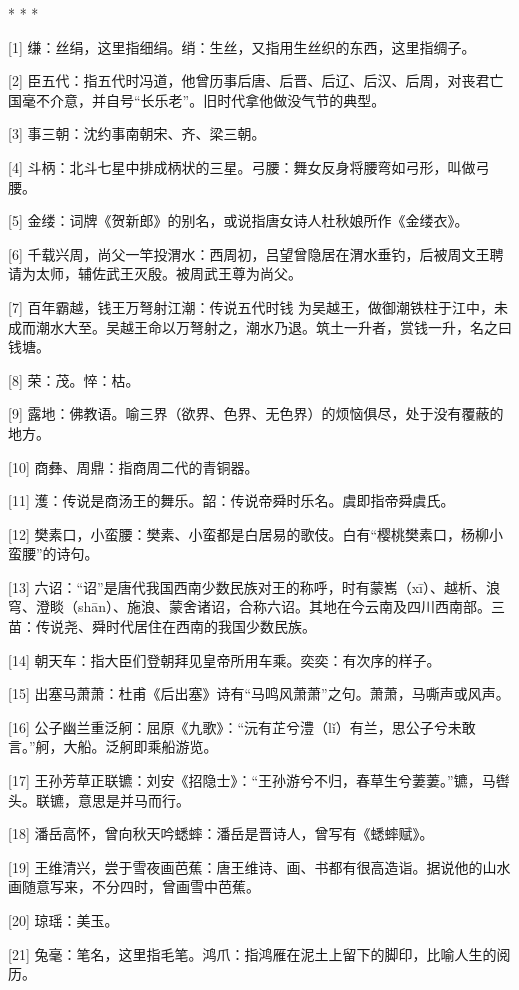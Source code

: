 \documentclass[12pt,UTF8]{ctexbook}
\begin{document}
* * *



[1] 缣：丝绢，这里指细绢。绡：生丝，又指用生丝织的东西，这里指绸子。

[2] 臣五代：指五代时冯道，他曾历事后唐、后晋、后辽、后汉、后周，对丧君亡国毫不介意，并自号“长乐老”。旧时代拿他做没气节的典型。

[3] 事三朝：沈约事南朝宋、齐、梁三朝。

[4] 斗柄：北斗七星中排成柄状的三星。弓腰：舞女反身将腰弯如弓形，叫做弓腰。

[5] 金缕：词牌《贺新郎》的别名，或说指唐女诗人杜秋娘所作《金缕衣》。

[6] 千载兴周，尚父一竿投渭水：西周初，吕望曾隐居在渭水垂钓，后被周文王聘请为太师，辅佐武王灭殷。被周武王尊为尚父。

[7] 百年霸越，钱王万弩射江潮：传说五代时钱 为吴越王，做御潮铁柱于江中，未成而潮水大至。吴越王命以万弩射之，潮水乃退。筑土一升者，赏钱一升，名之曰钱塘。

[8] 荣：茂。悴：枯。

[9] 露地：佛教语。喻三界（欲界、色界、无色界）的烦恼俱尽，处于没有覆蔽的地方。

[10] 商彝、周鼎：指商周二代的青铜器。

[11] 濩：传说是商汤王的舞乐。韶：传说帝舜时乐名。虞即指帝舜虞氏。

[12] 樊素口，小蛮腰：樊素、小蛮都是白居易的歌伎。白有“樱桃樊素口，杨柳小蛮腰”的诗句。

[13] 六诏：“诏”是唐代我国西南少数民族对王的称呼，时有蒙嶲（xī）、越析、浪穹、澄睒（shān）、施浪、蒙舍诸诏，合称六诏。其地在今云南及四川西南部。三苗：传说尧、舜时代居住在西南的我国少数民族。

[14] 朝天车：指大臣们登朝拜见皇帝所用车乘。奕奕：有次序的样子。

[15] 出塞马萧萧：杜甫《后出塞》诗有“马鸣风萧萧”之句。萧萧，马嘶声或风声。

[16] 公子幽兰重泛舸：屈原《九歌》：“沅有芷兮澧（lǐ）有兰，思公子兮未敢言。”舸，大船。泛舸即乘船游览。

[17] 王孙芳草正联镳：刘安《招隐士》：“王孙游兮不归，春草生兮萋萋。”镳，马辔头。联镳，意思是并马而行。

[18] 潘岳高怀，曾向秋天吟蟋蟀：潘岳是晋诗人，曾写有《蟋蟀赋》。

[19] 王维清兴，尝于雪夜画芭蕉：唐王维诗、画、书都有很高造诣。据说他的山水画随意写来，不分四时，曾画雪中芭蕉。

[20] 琼瑶：美玉。

[21] 兔毫：笔名，这里指毛笔。鸿爪：指鸿雁在泥土上留下的脚印，比喻人生的阅历。
\end{document}
